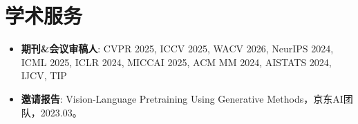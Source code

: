 \documentclass{resume}
\begin{document}
\section{\makebox[.75em][c]{\faUsers} \textbf{\fangsong 学术服务}}
\begin{itemize}
    \item \textbf{\kaishu 期刊\&会议审稿人}: CVPR 2025, ICCV 2025, WACV 2026, NeurIPS 2024, ICML 2025, ICLR 2024, MICCAI 2025, ACM MM 2024, AISTATS 2024, IJCV, TIP
    \item \textbf{\kaishu 邀请报告}: Vision-Language Pretraining Using Generative Methods，京东AI团队，2023.03。
\end{itemize}

\end{document}
